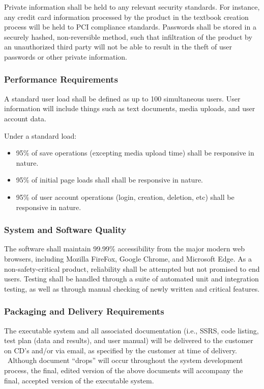 \documentclass[onecolumn, draftclsnofoot,10pt, compsoc]{IEEEtran}
\begin{document}
{{\noindent
Private information shall be held to any relevant security standards. For instance,
any credit card information processed by the product in the textbook creation process
will be held to PCI compliance standards. Passwords shall be stored in a securely hashed,
non-reversible method, such that infiltration of the product by an unauthorized
third party will not be able to result in the theft of user passwords or other private
information.}

\subsubsection[Performance Requirements]{Performance Requirements}

{\noindent
A standard user load shall be defined as up to 100 simultaneous users. User information
will include things such as text documents, media uploads, and user account data.

Under a standard load:
\begin{itemize}
  \item 95\% of save operations (excepting media upload time) shall be responsive in
  nature.
  \item 95\% of initial page loads shall shall be responsive in
  nature.
  \item 95\% of user account operations (login, creation, deletion, etc) shall be
  responsive in nature.
\end{itemize}}

\subsubsection[System and Software Quality]{System and Software Quality}

The software shall maintain 99.99\% accessibility from the major modern web browsers, including Mozilla FireFox,
Google Chrome, and Microsoft Edge.
As a non-safety-critical product, reliability shall be attempted but not promised
to end users. Testing shall be handled through a suite of automated unit and integration testing, as well as
through manual checking of newly written and critical features.

\subsubsection[Packaging and Delivery Requirements]{Packaging and Delivery Requirements}

{\noindent
The executable system and all associated documentation (i.e., SSRS,
code listing, test plan (data and results), and user manual) will be
delivered to the customer on CD{\textquoteright}s and/or via email, as
specified by the customer at time of delivery. \ Although document
{\textquotedblleft}drops{\textquotedblright} will occur throughout the
system development process, the final, edited version of the above
documents will accompany the final, accepted version of the executable
system.}

}
\end{document}
